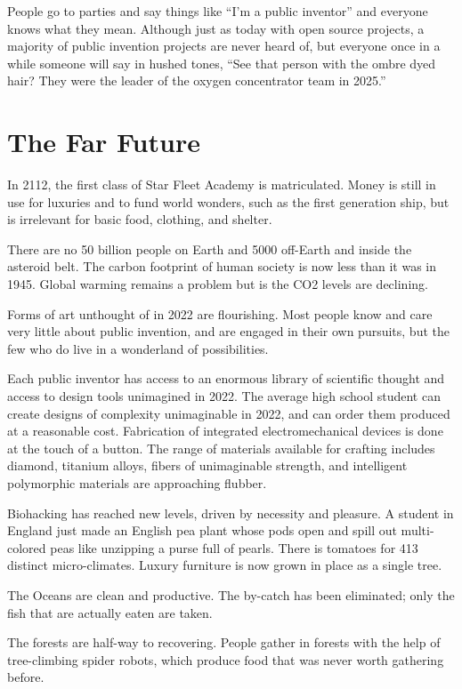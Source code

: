 \documentclass[
	fontsize=10pt, %
	twoside=false, %
	secnumdepth=1, %
]{kaobook}
\begin{document}
People go to parties and say things like ``I'm a public inventor''
and everyone knows what they mean.
Although just as today with open source projects, a majority
of public invention projects are never heard of, but
everyone once in a while someone will say in hushed tones,
``See that person with the ombre dyed hair? They were the
leader of the oxygen concentrator team in 2025.''

\section{The Far Future}

In 2112, the first class of Star Fleet Academy is matriculated.
Money is still in use for luxuries and to fund world wonders,
such as the first generation ship, but is irrelevant
for basic food, clothing, and shelter.

There are no 50 billion people on Earth and 5000 off-Earth
and inside the asteroid belt. The carbon footprint of human
society is now less than it was in 1945. Global warming
remains a problem but is the CO2 levels are declining.

Forms of art unthought of in 2022 are flourishing.
Most people know and care very little about public invention,
and are engaged in their own pursuits, but
the few who do live in a wonderland of possibilities.

Each public inventor has access to an enormous library of
scientific thought and access to design tools unimagined in 2022.
The average high school student can create designs of
complexity unimaginable in 2022, and can order them
produced at a reasonable cost.
Fabrication of integrated electromechanical devices is
done at the touch of a button.
The range of materials available for crafting includes
diamond, titanium alloys, fibers of unimaginable strength,
and intelligent polymorphic materials are approaching flubber.

Biohacking has reached new levels, driven by necessity and
pleasure. A student in England just made an English pea plant
whose pods open and spill out multi-colored peas like unzipping
a purse full of pearls.
There is tomatoes for 413 distinct micro-climates.
Luxury furniture is now grown in place as a single tree.

The Oceans are clean and productive. The by-catch has been
eliminated; only the fish that are actually eaten are taken.

The forests are half-way to recovering. People gather in forests
with the help of tree-climbing spider robots, which produce
food that was never worth gathering before.
\end{document}

